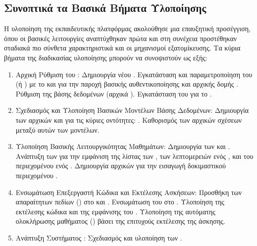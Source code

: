 \subsection{Συνοπτικά τα Βασικά Βήματα Υλοποίησης}
\label{sec:vimata_ylopoiisis_sum}
Η υλοποίηση της εκπαιδευτικής πλατφόρμας ακολούθησε μια επαυξητική προσέγγιση, όπου οι βασικές λειτουργίες αναπτύχθηκαν πρώτα και στη συνέχεια προστέθηκαν σταδιακά πιο σύνθετα χαρακτηριστικά και οι μηχανισμοί εξατομίκευσης. Τα κύρια βήματα της διαδικασίας υλοποίησης μπορούν να συνοψιστούν ως εξής:
\begin{enumerate}[leftmargin=*, noitemsep]
    \item Αρχική Ρύθμιση του :
    Δημιουργία νέου .
    Εγκατάσταση και παραμετροποίηση του  (ή ) με το  και  για την παροχή βασικής αυθεντικοποίησης και αρχικής δομής .
    Ρύθμιση της βάσης δεδομένων (αρχικά ).
    Εγκατάσταση του  για το .
    \item Σχεδιασμός και Υλοποίηση Βασικών Μοντέλων Βάσης Δεδομένων:
    Δημιουργία των αρχικών  και  για τις κύριες οντότητες: .
    Καθορισμός των αρχικών σχέσεων μεταξύ αυτών των μοντέλων.
    \item Υλοποίηση Βασικής Λειτουργικότητας Μαθημάτων:
    Δημιουργία των  και .
    Ανάπτυξη των  για την εμφάνιση της λίστας των , των λεπτομερειών ενός , και του περιεχομένου ενός .
    Δημιουργία αρχικών  για την εισαγωγή δοκιμαστικού περιεχομένου .
    \item Ενσωμάτωση Επεξεργαστή Κώδικα και Εκτέλεσης Ασκήσεων:
    Προσθήκη των απαραίτητων πεδίων () στο  και .
    Ενσωμάτωση του  στο .
    Υλοποίηση της  εκτέλεσης  κώδικα και της εμφάνισης του .
    Υλοποίηση της αυτόματης ολοκλήρωσης μαθήματος () βάσει της επιτυχούς εκτέλεσης της άσκησης.
    \item Ανάπτυξη Συστήματος :
    Σχεδιασμός και υλοποίηση των .

\end{enumerate}
